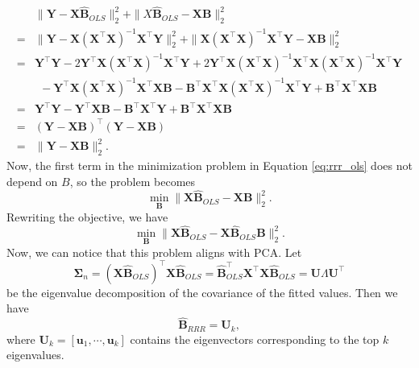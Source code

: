 \documentclass{bmcart}
\begin{document}
\begin{align*}
    &\|\mathbf{Y} - \mathbf{X}\widehat{\mathbf{B}}_{OLS}\|_2^2 + \|X\widehat{\mathbf{B}}_{OLS} - \mathbf{X}\mathbf{B}\|_2^2 \\ 
    =& \|\mathbf{Y} - \mathbf{X}(\mathbf{X}^\top \mathbf{X})^{-1} \mathbf{X}^\top \mathbf{Y}\|_2^2 + \|\mathbf{X}(\mathbf{X}^\top \mathbf{X})^{-1} \mathbf{X}^\top \mathbf{Y} - \mathbf{X}\mathbf{B}\|_2^2 \\
    =& \mathbf{Y}^\top \mathbf{Y} - 2 \mathbf{Y}^\top \mathbf{X}(\mathbf{X}^\top \mathbf{X})^{-1} \mathbf{X}^\top \mathbf{Y} + 2 \mathbf{Y}^\top \mathbf{X} (\mathbf{X}^\top \mathbf{X})^{-1} \mathbf{X}^\top \mathbf{X}(\mathbf{X}^\top \mathbf{X})^{-1} \mathbf{X}^\top \mathbf{Y} \\
    &~~- \mathbf{Y}^\top \mathbf{X} (\mathbf{X}^\top \mathbf{X})^{-1} \mathbf{X}^\top \mathbf{X}\mathbf{B} - \mathbf{B}^\top \mathbf{X}^\top \mathbf{X} (\mathbf{X}^\top \mathbf{X})^{-1} \mathbf{X}^\top \mathbf{Y} + \mathbf{B}^\top \mathbf{X}^\top \mathbf{X} \mathbf{B} \\
    =& \mathbf{Y}^\top \mathbf{Y} - \mathbf{Y}^\top \mathbf{X} \mathbf{B} - \mathbf{B}^\top \mathbf{X}^\top \mathbf{Y} + \mathbf{B}^\top \mathbf{X}^\top \mathbf{X} \mathbf{B} \\
    =& (\mathbf{Y}-\mathbf{X}\mathbf{B})^\top (\mathbf{Y}-\mathbf{X}\mathbf{B}) \\
    =& \|\mathbf{Y}-\mathbf{X}\mathbf{B}\|_2^2.
\end{align*}
Now, the first term in the minimization problem in Equation \eqref{eq:rrr_ols} does not depend on $B$, so the problem becomes
\begin{equation*}
    \min_\mathbf{B} \|\mathbf{X}\widehat{\mathbf{B}}_{OLS} - \mathbf{X}\mathbf{B}\|_2^2.
\end{equation*}
Rewriting the objective, we have
\begin{equation*}
    \min_\mathbf{B} \|\mathbf{X}\widehat{\mathbf{B}}_{OLS} - \mathbf{X}\widehat{\mathbf{B}}_{OLS} \mathbf{B}\|_2^2.
\end{equation*}
Now, we can notice that this problem aligns with PCA. Let 
$$\boldsymbol{\Sigma}_n = (\mathbf{X}\widehat{\mathbf{B}}_{OLS})^\top \mathbf{X}\widehat{\mathbf{B}}_{OLS} = \widehat{\mathbf{B}}_{OLS}^\top \mathbf{X}^\top \mathbf{X}\widehat{\mathbf{B}}_{OLS}=\mathbf{U}\Lambda \mathbf{U}^\top$$
be the eigenvalue decomposition of the covariance of the fitted values. Then we have
\begin{equation*}
    \widehat{\mathbf{B}}_{RRR} = \mathbf{U}_k,
\end{equation*}
where $\mathbf{U}_k=[\mathbf{u}_1,\cdots,\mathbf{u}_k]$ contains the eigenvectors corresponding to the top $k$ eigenvalues.
\end{document}
